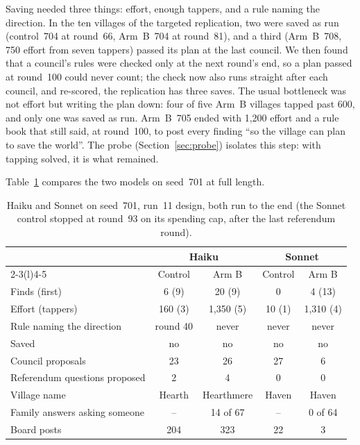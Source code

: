 \documentclass[11pt]{article}
\begin{document}
Saving needed three things: effort, enough tappers, and a rule naming the direction. In the ten
villages of the targeted replication, two were saved as run (control~704 at round~66, Arm~B~704 at
round~81), and a third (Arm~B~708, 750 effort from seven tappers) passed its plan at the last council.
We then found that a council's rules were checked only at the next round's end, so a plan passed at
round~100 could never count; the check now also runs straight after each council, and re-scored, the
replication has three saves. The usual bottleneck was not effort but writing the plan down: four of
five Arm~B villages tapped past 600, and only one was saved as run. Arm~B~705 ended with 1,200 effort
and a rule book that still said, at round~100, to post every finding ``so the village can plan to save the
world''. The probe (Section~\ref{sec:probe}) isolates this step: with tapping solved, it is what remained.

Table~\ref{tab:models} compares the two models on seed~701 at full length.

\begin{table}[ht]
\centering\small
\caption{Haiku and Sonnet on seed~701, run~11 design, both run to the end (the Sonnet control stopped
at round~93 on its spending cap, after the last referendum round).}\label{tab:models}
\begin{tabular}{@{}lcccc@{}}
\toprule
& \multicolumn{2}{c}{Haiku} & \multicolumn{2}{c}{Sonnet} \\
\cmidrule(lr){2-3}\cmidrule(l){4-5}
& Control & Arm B & Control & Arm B \\
\midrule
Finds (first) & 6 (9) & 20 (9) & 0 & 4 (13) \\
Effort (tappers) & 160 (3) & 1,350 (5) & 10 (1) & 1,310 (4) \\
Rule naming the direction & round 40 & never & never & never \\
Saved & no & no & no & no \\
Council proposals & 23 & 26 & 27 & 6 \\
Referendum questions proposed & 2 & 4 & 0 & 0 \\
Village name & Hearth & Hearthmere & Haven & Haven \\
Family answers asking someone & -- & 14 of 67 & -- & 0 of 64 \\
Board posts & 204 & 323 & 22 & 3 \\
\bottomrule
\end{tabular}
\end{table}
\end{document}
